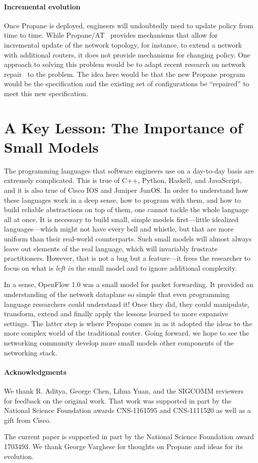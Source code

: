 \documentclass[10pt]{sigalternate052015}
\newcommand{\para}[1]{\paragraph*{\textbf{#1}}}
\begin{document}
\paragraph*{Incremental evolution}
Once Propane is deployed, engineers will undoubtedly need to update
policy from time to time.  While
Propane/AT~\cite{abstract-propane} provides mechanisms that allow for
incremental update of the network topology, for instance, to extend a
network with additional routers, it does not provide mechanisms for
changing policy.  One approach to solving this problem would be to
adapt recent research on network repair~\cite{Gember-Jacobson:SOSP17}
to the problem.  The idea here would be that the new Propane
program would be the specification and the existing set of
configurations be ``repaired'' to meet this new specification.

\section{A Key Lesson:  The Importance of Small Models}
\label{sec:conclusions}

The programming languages that software engineers use on a day-to-day
basis are extremely complicated.  This is true of C++, Python, Haskell, and
JavaScript, and it is also true of Cisco IOS and Juniper JunOS.  In order to understand
how these languages work in a deep sense, how to program with them,
and how to build reliable abstractions on top of them, one cannot
tackle the whole language all at once.  It is necessary to build
small, simple models first---little idealized languages---which might
not have every bell and whistle, but that are more uniform than their
real-world counterparts.  Such
small models will almost always leave out elements of the
real language, which will invariably frustrate practitioners.
However, that is
not a bug  but a feature---it frees the researcher to focus on
what is \emph{left in} the small model and to ignore additional complexity.

In a sense, OpenFlow 1.0 was a small model for packet forwarding.  It provided an understanding of the network dataplane so
simple that even programming language researchers could understand it!
Once they did, they could manipulate, transform, extend and
finally apply the lessons learned to more expansive settings.  The
latter step is where Propane comes in as it adopted the ideas to the
more complex world of the traditional router.  Going forward, we hope
to see the networking community develop more small models other
components of the networking stack.

\para{Acknowledgments}
We thank R. Aditya, George Chen,  Lihua Yuan, and the SIGCOMM reviewers for feedback on the original
work. That work was supported in part by the National Science
Foundation awards CNS-1161595 and CNS-1111520 as well as a gift from
Cisco.

The current paper is supported in part by the National Science
Foundation award 1703493.  We thank George Varghese for
thoughts on Propane and ideas for its evolution.


\balance




\end{document}
